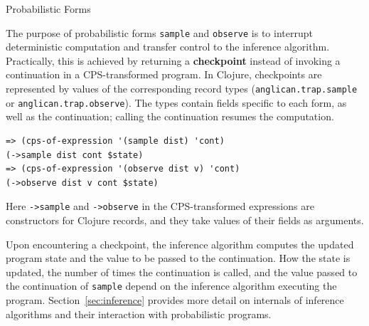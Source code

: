 \documentclass[preprint]{sigplanconf}
\begin{document}
\iftoggle{full}{\subsubsection}{\subsection}{Probabilistic Forms}
\label{seq:forms}

The purpose of probabilistic forms \texttt{sample} and
\texttt{observe} is to interrupt deterministic computation and
transfer control to the inference algorithm.  Practically, this
is achieved by  returning a \textbf{checkpoint} instead of
invoking a continuation in a CPS-transformed program.  In
Clojure, checkpoints are represented by values of the
corresponding record types
(\texttt{anglican.{\linebreak[0]}trap.{\linebreak[0]}sample} or
\texttt{anglican.{\linebreak[0]}trap.{\linebreak[0]}observe}).
The types contain fields specific to each form, as well as the
continuation; calling the continuation resumes the computation.
\begin{lstlisting}[style=default]
=> (cps-of-expression '(sample dist) 'cont)
(->sample dist cont $state)
=> (cps-of-expression '(observe dist v) 'cont)
(->observe dist v cont $state)
\end{lstlisting}
Here \texttt{->sample} and \texttt{->observe} in the
CPS-transformed expressions are constructors for Clojure
records, and they take values of their fields as arguments.

Upon encountering a checkpoint, the inference algorithm computes
the updated program state and the value to be passed to the
continuation.  How the state is updated, the number of times the
continuation is called, and the value passed to the continuation
of \texttt{sample} depend on the inference algorithm executing
the program.  Section~\ref{sec:inference} provides more detail
on internals of inference algorithms and their interaction with
probabilistic programs.

\iftoggle{full}{%
\smallskip
\begin{center}
*\qquad*\qquad*
\end{center}

In addition to \texttt{sample} and \texttt{observe}, there are a few other special
forms ---  \texttt{store}, \texttt{retrieve}, \texttt{mem} ---
which modify program state. These forms are translated into
expressions involving calls of functions from the
\texttt{anglican.state} namespace. The \texttt{mem} form, which
implements memoization, deserves a more detailed explanation.
}{%
}%
\end{document}
